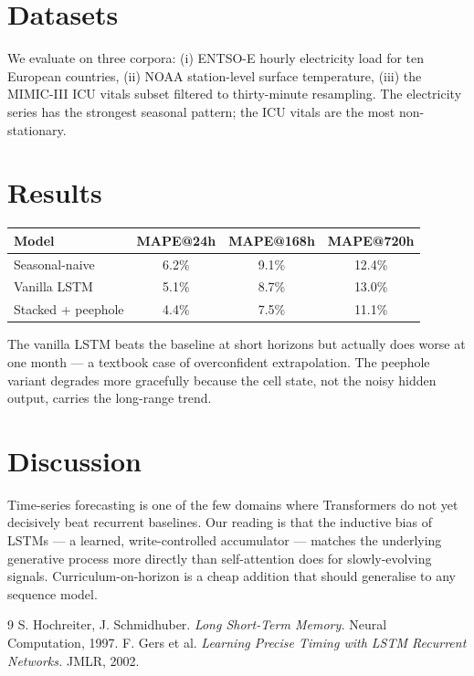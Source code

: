 \documentclass[11pt]{article}
\begin{document}
\section{Datasets}
We evaluate on three corpora: (i) ENTSO-E hourly electricity load for ten
European countries, (ii) NOAA station-level surface temperature, (iii) the
MIMIC-III ICU vitals subset filtered to thirty-minute resampling. The
electricity series has the strongest seasonal pattern; the ICU vitals are
the most non-stationary.

\section{Results}
\begin{tabular}{lccc}
\hline
Model & MAPE@24h & MAPE@168h & MAPE@720h \\
\hline
Seasonal-naive & 6.2\% & 9.1\% & 12.4\% \\
Vanilla LSTM   & 5.1\% & 8.7\% & 13.0\% \\
Stacked + peephole & 4.4\% & 7.5\% & 11.1\% \\
\hline
\end{tabular}

The vanilla LSTM beats the baseline at short horizons but actually does
worse at one month --- a textbook case of overconfident extrapolation.
The peephole variant degrades more gracefully because the cell state, not
the noisy hidden output, carries the long-range trend.

\section{Discussion}
Time-series forecasting is one of the few domains where Transformers do not
yet decisively beat recurrent baselines. Our reading is that the inductive
bias of LSTMs --- a learned, write-controlled accumulator --- matches the
underlying generative process more directly than self-attention does for
slowly-evolving signals. Curriculum-on-horizon is a cheap addition that
should generalise to any sequence model.


\begin{thebibliography}{9}
 S. Hochreiter, J. Schmidhuber. \emph{Long Short-Term Memory.} Neural Computation, 1997.
 F. Gers et al. \emph{Learning Precise Timing with LSTM Recurrent Networks.} JMLR, 2002.
\end{thebibliography}
\end{document}
